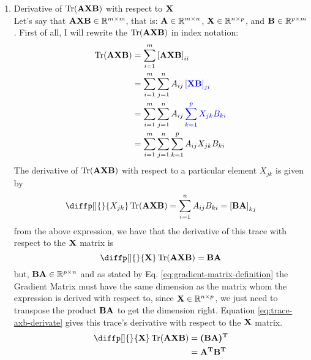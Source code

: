 \documentclass[12pt]{article}
\begin{document}
\begin{enumerate}
    \item Derivative of $\Tr(\mat{AXB})$ with respect to $\mat{X}$\\
    Let's say that $\mat{AXB} \in \R^{m \times m}$, that is: $\mat{A} \in \R^{m\times n}$, $\mat{X} \in \R^{n\times p}$, and $\mat{B} \in \R^{p\times m}$. First of all, I will rewrite the $\Tr(\mat{AXB})$ in index notation:
    \begin{equation*}
        \begin{aligned}
            \Tr(\mat{AXB}) &= \Sum{1}{m} \brac{\mat{AXB}}_{ii}\\
            &= \Sum{1}{m}\Sum[j]{1}{n} A_{ij} \blue{\brac{\mat{XB}}_{ji}}\\
            &= \Sum{1}{m}\Sum[j]{1}{n} A_{ij} \blue{\Sum[k]{1}{p} X_{jk} B_{ki}}\\
            &= \Sum{1}{m}\Sum[j]{1}{n}\Sum[k]{1}{p} A_{ij} X_{jk} B_{ki}\\
        \end{aligned}
    \end{equation*}
    The derivative of $\Tr(\mat{AXB})$ with respect to a particular element $X_{jk}$ is given by
    \begin{equation}
        \diffp[]{}{X_{jk}} \Tr(\mat{AXB}) = \Sum{1}{n} A_{ij} B_{ki} = \brac{\mat{B A}}_{kj}
        \label{eq:trace-axb-derivative-with-respect-to-scalar}
    \end{equation}
    from the above expression, we have that the derivative of this trace with respect to the $\mat{X}$ matrix is
    \begin{equation*}
        \diffp[]{}{\mat{X}} \Tr(\mat{AXB}) = \mat{B A}
    \end{equation*}
    but, $\mat{B A} \in \R^{p\times n}$ and as stated by Eq. \ref{eq:gradient-matrix-definition} the Gradient Matrix must have the same dimension as the matrix whom the expression is derived with respect to, since $\mat{X} \in \R^{n\times p}$, we just need to transpose the product $\mat{BA}$ to get the dimension right. Equation \ref{eq:trace-axb-derivate} gives this trace's derivative with respect to the $\mat{X}$ matrix.
    \begin{equation}
    \begin{aligned}
        \diffp[]{}{\mat{X}} \Tr(\mat{AXB}) &= \mat{(B A)^T}\\
        &= \mat{A^T B^T}
    \end{aligned}
    \label{eq:trace-axb-derivate}
    \end{equation}
    

\end{enumerate}
\end{document}
